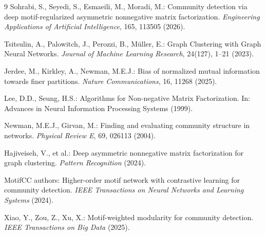 \documentclass[11pt,a4paper]{article}
\begin{document}
\begin{thebibliography}{9}
 Sohrabi, S., Seyedi, S., Esmaeili, M., Moradi, M.: Community detection via deep motif-regularized asymmetric nonnegative matrix factorization. \emph{Engineering Applications of Artificial Intelligence}, 165, 113505 (2026).

 Tsitsulin, A., Palowitch, J., Perozzi, B., M\"uller, E.: Graph Clustering with Graph Neural Networks. \emph{Journal of Machine Learning Research}, 24(127), 1--21 (2023).

 Jerdee, M., Kirkley, A., Newman, M.E.J.: Bias of normalized mutual information towards finer partitions. \emph{Nature Communications}, 16, 11268 (2025).

 Lee, D.D., Seung, H.S.: Algorithms for Non-negative Matrix Factorization. In: Advances in Neural Information Processing Systems (1999).

 Newman, M.E.J., Girvan, M.: Finding and evaluating community structure in networks. \emph{Physical Review E}, 69, 026113 (2004).

 Hajiveiseh, V., et al.: Deep asymmetric nonnegative matrix factorization for graph clustering. \emph{Pattern Recognition} (2024).

 MotifCC authors: Higher-order motif network with contrastive learning for community detection. \emph{IEEE Transactions on Neural Networks and Learning Systems} (2024).

 Xiao, Y., Zou, Z., Xu, X.: Motif-weighted modularity for community detection. \emph{IEEE Transactions on Big Data} (2025).
\end{thebibliography}
\end{document}
